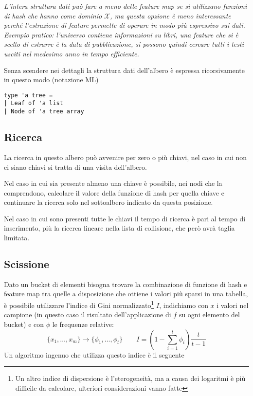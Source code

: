 \documentclass[a4paper]{article}
\begin{document}

\textit{L'intera struttura dati può fare a meno delle feature map se si utilizzano funzioni di hash che hanno come dominio $\mathcal{X}$, ma questa opzione è meno interessante perché l'estrazione di feature permette di operare in modo più espressivo sui dati. Esempio pratico: l'universo contiene informazioni su libri, una feature che si è scelto di estrarre è la data di pubblicazione, si possono quindi cercare tutti i testi usciti nel medesimo anno in tempo efficiente.}

Senza scendere nei dettagli la struttura dati dell'albero è espressa ricorsivamente in questo modo (notazione ML)
\begin{verbatim}
type 'a tree =
| Leaf of 'a list
| Node of 'a tree array
\end{verbatim}

\subsection*{Ricerca}

La ricerca in questo albero può avvenire per zero o più chiavi, nel caso in cui non ci siano chiavi si tratta di una visita dell'albero.

Nel caso in cui sia presente almeno una chiave è possibile, nei nodi che la comprendono, calcolare il valore della funzione di hash per quella chiave e continuare la ricerca solo nel sottoalbero indicato da questa posizione.

Nel caso in cui sono presenti tutte le chiavi il tempo di ricerca è pari al tempo di inserimento, più la ricerca lineare nella lista di collisione, che però avrà taglia limitata.

\subsection*{Scissione}
Dato un bucket di elementi bisogna trovare la combinazione di funzione di hash e feature map tra quelle a disposizione che ottiene i valori più sparsi in una tabella, è possibile utilizzare l'indice di Gini normalizzato\footnote{Un altro indice di dispersione è l'eterogeneità, ma a causa dei logaritmi è più difficile da calcolare, ulteriori considerazioni vanno fatte} $I$, indichiamo con $x$ i valori nel campione (in questo caso il risultato dell'applicazione di $f$ su ogni elemento del bucket) e con $\phi$ le frequenze relative:
$$ \{ x_1, \ldots, x_m \} \rightarrow \{ \phi_1, \ldots, \phi_t \} \qquad I = \left( 1 - \sum_{i=1}^{t}\phi_i \right) \frac{t}{t - 1} $$
Un algoritmo ingenuo che utilizza questo indice è il seguente
\end{document}
